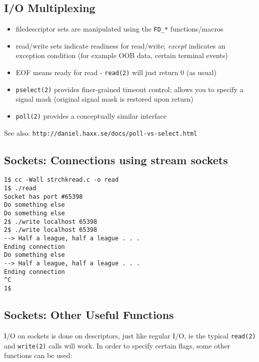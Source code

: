 \documentclass[xga]{xdvislides}
\begin{document}
\subsection{I/O Multiplexing}
\begin{itemize}
	\item filedescriptor sets are manipulated using the {\tt FD\_*} functions/macros
	\item read/write sets indicate readiness for read/write; {\em except} indicates an exception condition (for example OOB data, certain terminal events)
	\item EOF means ready for read - {\tt read(2)} will just return 0 (as usual)
	\item {\tt pselect(2)} provides finer-grained timeout control;
allows you to specify a signal mask (original signal mask is restored
upon return)
	\item {\tt poll(2)} provides a conceptually similar interface
\end{itemize}
\vspace{.5in}
See also: \verb+http://daniel.haxx.se/docs/poll-vs-select.html+

\subsection{Sockets: Connections using stream sockets}
\begin{verbatim}
1$ cc -Wall strchkread.c -o read
1$ ./read
Socket has port #65398
Do something else
Do something else
2$ ./write localhost 65398
2$ ./write localhost 65398
‐-> Half a league, half a league . . .
Ending connection
Do something else
--> Half a league, half a league . . .
Ending connection
^C
1$
\end{verbatim}
\vfill


\subsection{Sockets: Other Useful Functions}

I/O on sockets is done on descriptors, just like regular I/O, ie the typical
{\tt read(2)} and {\tt write(2)} calls will work.  In order to specify certain
flags, some other functions can be used:
\end{document}
